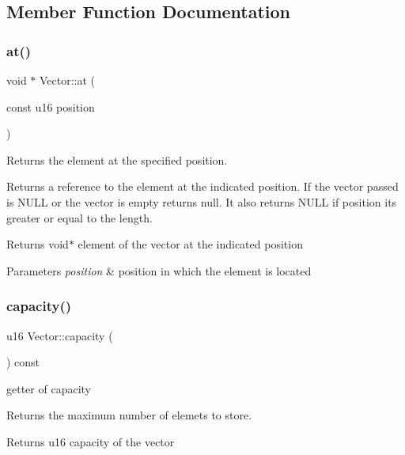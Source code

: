 \subsection{Member Function Documentation}
\mbox{\label{class_vector_a56f4698af2478b8dc6710094855f65e9}} 
\subsubsection{\texorpdfstring{at()}{at()}}
{\footnotesize\ttfamily void $\ast$ Vector\+::at (\begin{DoxyParamCaption}\item[{const u16}]{position }\end{DoxyParamCaption})}



Returns the element at the specified position. 

Returns a reference to the element at the indicated position. If the vector passed is N\+U\+LL or the vector is empty returns null. It also returns N\+U\+LL if position it\textquotesingle{}s greater or equal to the length.

\begin{DoxyReturn}{Returns}
void$\ast$ element of the vector at the indicated position 
\end{DoxyReturn}

\begin{DoxyParams}{Parameters}
{\em position} & position in which the element is located \\
\hline
\end{DoxyParams}
\mbox{\label{class_vector_a8f7d8bd11c88b8373e10fd1650ec17fb}} 
\subsubsection{\texorpdfstring{capacity()}{capacity()}}
{\footnotesize\ttfamily u16 Vector\+::capacity (\begin{DoxyParamCaption}{ }\end{DoxyParamCaption}) const}



getter of capacity 

Returns the maximum number of elemets to store.

\begin{DoxyReturn}{Returns}
u16 capacity of the vector 
\end{DoxyReturn}
\mbox{\label{class_vector_a7fff9a3f12f5ffe8a132e81a55c04f70}} 
